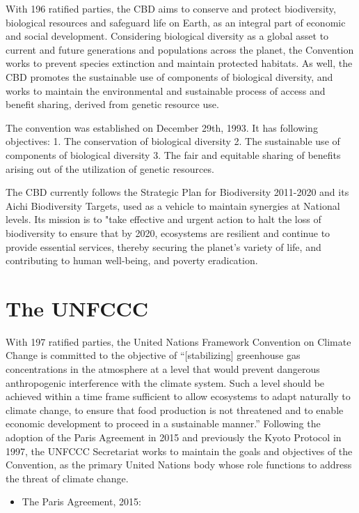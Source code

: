 \documentclass[
  openany]{book}
\providecommand{\tightlist}{%
  \setlength{\itemsep}{0pt}\setlength{\parskip}{0pt}}
\begin{document}
With 196 ratified parties, the CBD aims to conserve and protect biodiversity, biological resources and safeguard life on Earth, as an integral part of economic and social development. Considering biological diversity as a global asset to current and future generations and populations across the planet, the Convention works to prevent species extinction and maintain protected habitats. As well, the CBD promotes the sustainable use of components of biological diversity, and works to maintain the environmental and sustainable process of access and benefit sharing, derived from genetic resource use.

The convention was established on December 29th, 1993. It has following objectives:
1. The conservation of biological diversity
2. The sustainable use of components of biological diversity
3. The fair and equitable sharing of benefits arising out of the utilization of genetic resources.

The CBD currently follows the Strategic Plan for Biodiversity 2011-2020 and its Aichi Biodiversity Targets, used as a vehicle to maintain synergies at National levels. Its mission is to "take effective and urgent action to halt the loss of biodiversity to ensure that by 2020, ecosystems are resilient and continue to provide essential services, thereby securing the planet's variety of life, and contributing to human well-being, and poverty eradication.

\hypertarget{the-unfccc}{%
\section{The UNFCCC}\label{the-unfccc}}

With 197 ratified parties, the United Nations Framework Convention on Climate Change is committed to the objective of ``{[}stabilizing{]} greenhouse gas concentrations in the atmosphere at a level that would prevent dangerous anthropogenic interference with the climate system. Such a level should be achieved within a time frame sufficient to allow ecosystems to adapt naturally to climate change, to ensure that food production is not threatened and to enable economic development to proceed in a sustainable manner.'' Following the adoption of the Paris Agreement in 2015 and previously the Kyoto Protocol in 1997, the UNFCCC Secretariat works to maintain the goals and objectives of the Convention, as the primary United Nations body whose role functions to address the threat of climate change.

\begin{itemize}
\tightlist
\item
  The Paris Agreement, 2015:
\end{itemize}
\end{document}
